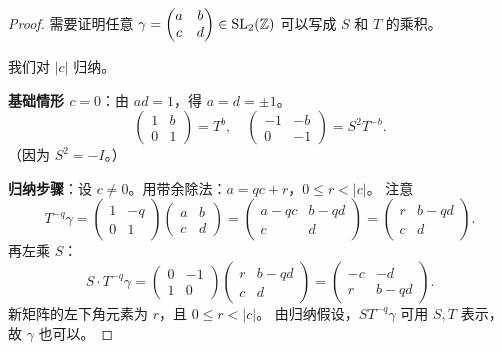 \begin{proof}
需要证明任意 $\gamma = \begin{pmatrix} a & b \\ c & d \end{pmatrix} \in \mathrm{SL}_2(\mathbb{Z})$
可以写成 $S$ 和 $T$ 的乘积。

我们对 $|c|$ 归纳。

\textbf{基础情形 $c = 0$}：由 $ad = 1$，得 $a = d = \pm 1$。
\[
  \begin{pmatrix} 1 & b \\ 0 & 1 \end{pmatrix} = T^b, \quad
  \begin{pmatrix} -1 & -b \\ 0 & -1 \end{pmatrix} = S^2 T^{-b}.
\]
（因为 $S^2 = -I$。）

\textbf{归纳步骤}：设 $c \neq 0$。用带余除法：$a = qc + r$，$0 \leq r < |c|$。
注意
\[
  T^{-q} \gamma
  = \begin{pmatrix} 1 & -q \\ 0 & 1 \end{pmatrix}
    \begin{pmatrix} a & b \\ c & d \end{pmatrix}
  = \begin{pmatrix} a - qc & b - qd \\ c & d \end{pmatrix}
  = \begin{pmatrix} r & b-qd \\ c & d \end{pmatrix}.
\]
再左乘 $S$：
\[
  S \cdot T^{-q} \gamma
  = \begin{pmatrix} 0 & -1 \\ 1 & 0 \end{pmatrix}
    \begin{pmatrix} r & b-qd \\ c & d \end{pmatrix}
  = \begin{pmatrix} -c & -d \\ r & b-qd \end{pmatrix}.
\]
新矩阵的左下角元素为 $r$，且 $0 \leq r < |c|$。
由归纳假设，$ST^{-q}\gamma$ 可用 $S, T$ 表示，故 $\gamma$ 也可以。
\end{proof}


